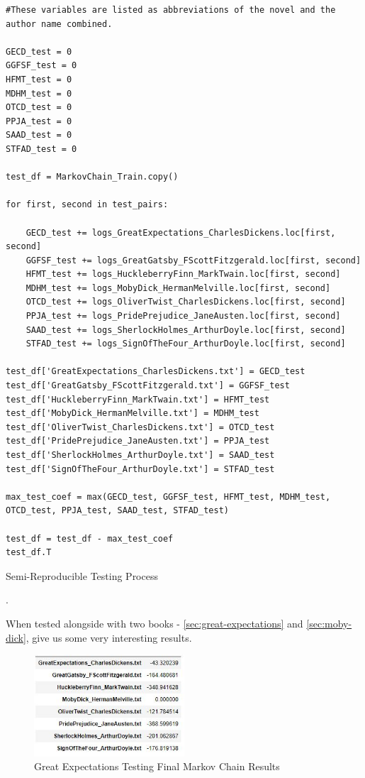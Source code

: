 \begin{code}
\label{code:testing-matrix-gen}
\begin{verbatim}
#These variables are listed as abbreviations of the novel and the author name combined.
    
GECD_test = 0
GGFSF_test = 0
HFMT_test = 0
MDHM_test = 0
OTCD_test = 0
PPJA_test = 0
SAAD_test = 0
STFAD_test = 0

test_df = MarkovChain_Train.copy()

for first, second in test_pairs:
    
    GECD_test += logs_GreatExpectations_CharlesDickens.loc[first, second]
    GGFSF_test += logs_GreatGatsby_FScottFitzgerald.loc[first, second]
    HFMT_test += logs_HuckleberryFinn_MarkTwain.loc[first, second]
    MDHM_test += logs_MobyDick_HermanMelville.loc[first, second]
    OTCD_test += logs_OliverTwist_CharlesDickens.loc[first, second]
    PPJA_test += logs_PridePrejudice_JaneAusten.loc[first, second]
    SAAD_test += logs_SherlockHolmes_ArthurDoyle.loc[first, second]
    STFAD_test += logs_SignOfTheFour_ArthurDoyle.loc[first, second]

test_df['GreatExpectations_CharlesDickens.txt'] = GECD_test
test_df['GreatGatsby_FScottFitzgerald.txt'] = GGFSF_test
test_df['HuckleberryFinn_MarkTwain.txt'] = HFMT_test
test_df['MobyDick_HermanMelville.txt'] = MDHM_test
test_df['OliverTwist_CharlesDickens.txt'] = OTCD_test
test_df['PridePrejudice_JaneAusten.txt'] = PPJA_test
test_df['SherlockHolmes_ArthurDoyle.txt'] = SAAD_test
test_df['SignOfTheFour_ArthurDoyle.txt'] = STFAD_test

max_test_coef = max(GECD_test, GGFSF_test, HFMT_test, MDHM_test, OTCD_test, PPJA_test, SAAD_test, STFAD_test)

test_df = test_df - max_test_coef
test_df.T
\end{verbatim}
\caption{Semi-Reproducible Testing Process}.
\end{code}

When tested alongside with two books - \ref{sec:great-expectations} and \ref{sec:moby-dick}, give us some very interesting results. 

\begin{figure}[H]
	\begin{center}
		\includegraphics[width = 0.5\textwidth]{Images/testing_greatexp.JPG} %
		\caption{Great Expectations Testing Final Markov Chain Results}
		\label{fig:test-great-expectations}
	\end{center}
\end{figure}


